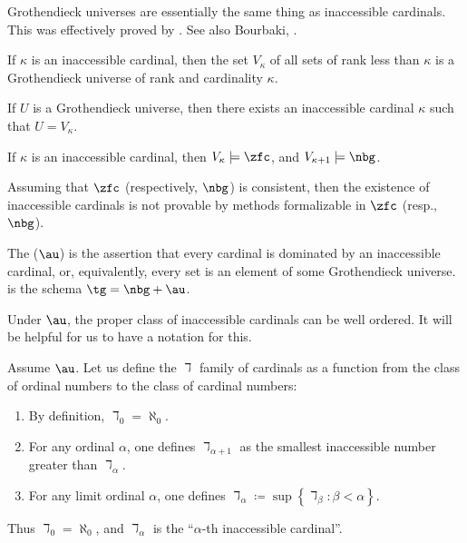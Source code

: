 Grothendieck universes are essentially the same thing as inaccessible cardinals.
This was effectively proved by \cite{Tarski1938}.
See also Bourbaki, \citeauthor[Exposé I, Appendix]{SGA4-1}.
\begin{proposition}
	If $\kappa$ is an inaccessible cardinal, then
	the set $V_{\kappa}$ of all sets of rank less than $\kappa$ is
	a Grothendieck universe of rank and cardinality $\kappa$.

	If $ U $ is a Grothendieck universe, then
	there exists an inaccessible cardinal $ \kappa $ such that $ U = V_{\kappa} $.
\end{proposition}

\begin{theorem}
	If $ \kappa $ is an inaccessible cardinal,
	then $V_{\kappa} \models \zfc $, and
	$ V_{\kappa+1} \models \nbg $.
	
	Assuming that $ \zfc $ (respectively, $ \nbg $) is consistent, then
	the existence of inaccessible cardinals is not provable
	by methods formalizable in $ \zfc $ (resp., $ \nbg $).
\end{theorem}

\begin{axiom}%
\label{axm:AU}
	The  ($ \au $) is the assertion that
	every cardinal is dominated by an inaccessible cardinal,
	or, equivalently, every set is an element of some Grothendieck universe.
	 is the schema $\tg = \nbg+\au$.
\end{axiom}

Under $ \au $, the proper class of inaccessible cardinals
can be well ordered.
It will be helpful for us to have a notation for this.

\begin{definition}
	Assume $ \au $.
	Let us define the $ \daleth $ family of cardinals
	as a function from the class of ordinal numbers
	to the class of cardinal numbers:
	\begin{enumerate}
		\item By definition, $ \daleth_0 = \aleph_0 $.
		\item For any ordinal $ \alpha $,
			one defines $ \daleth_{\alpha+1} $ as
			the smallest inaccessible number
			greater than $ \daleth_{\alpha} $.
		\item For any limit ordinal $ \alpha $,
			one defines $ \daleth_{\alpha} \coloneq \sup \left\{ \daleth_{\beta} : \beta < \alpha \right\} $.
	\end{enumerate}
	Thus $ \daleth_0 = \aleph_0 $, and
	$ \daleth_{\alpha} $ is the
	\enquote{$ \alpha $-th inaccessible cardinal}.
\end{definition}

